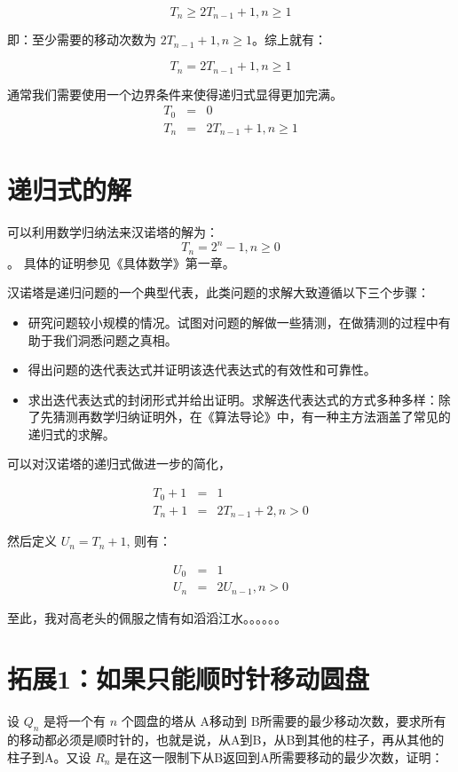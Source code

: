 \documentclass[10pt,a4paper,UTF8]{article}
\begin{document}
\[T_{n}\ge 2T_{n-1} + 1, n\ge 1\]

即：至少需要的移动次数为 \(2T_{n-1} + 1, n\ge 1\)。综上就有：

\[T_{n} = 2T_{n-1} + 1, n\ge 1\]

通常我们需要使用一个边界条件来使得递归式显得更加完满。
\begin{eqnarray}
\label{eq:3}
T_{0} &=& 0 \\
T_{n} &=& 2T_{n-1} + 1, n\ge 1
\end{eqnarray}

\section{递归式的解}
\label{sec:orgheadline3}


可以利用数学归纳法来汉诺塔的解为： \[T_{n}=2^{n}-1,n\ge 0\]。 具体的证明参见《具体数学》第一章。

汉诺塔是递归问题的一个典型代表，此类问题的求解大致遵循以下三个步骤：
\begin{itemize}
\item 研究问题较小规模的情况。试图对问题的解做一些猜测，在做猜测的过程中有助于我们洞悉问题之真相。
\item 得出问题的迭代表达式并证明该迭代表达式的有效性和可靠性。
\item 求出迭代表达式的封闭形式并给出证明。求解迭代表达式的方式多种多样：除了先猜测再数学归纳证明外，在《算法导论》中，有一种主方法涵盖了常见的递归式的求解。
\end{itemize}

可以对汉诺塔的递归式做进一步的简化，

\begin{eqnarray}
\label{eq:4}
T_{0} +1 &=& 1  \\ 
T_{n} +1 &=& 2T_{n-1} +2 , n>0
\end{eqnarray}

然后定义 \(U_{n} = T_{n} +1\), 则有：

\begin{eqnarray}
\label{eq:5}
U_{0} &=& 1  \\ 
U_{n}  &=& 2U_{n-1} , n>0
\end{eqnarray}


至此，我对高老头的佩服之情有如滔滔江水。。。。。。
\section{拓展1：如果只能顺时针移动圆盘}
\label{sec:orgheadline4}


设 \(Q_{n}\) 是将一个有 \(n\) 个圆盘的塔从 A移动到 B所需要的最少移动次数，要求所有的移动都必须是顺时针的，也就是说，从A到B，从B到其他的柱子，再从其他的柱子到A。又设 \(R_{n}\) 是在这一限制下从B返回到A所需要移动的最少次数，证明：
\end{document}

